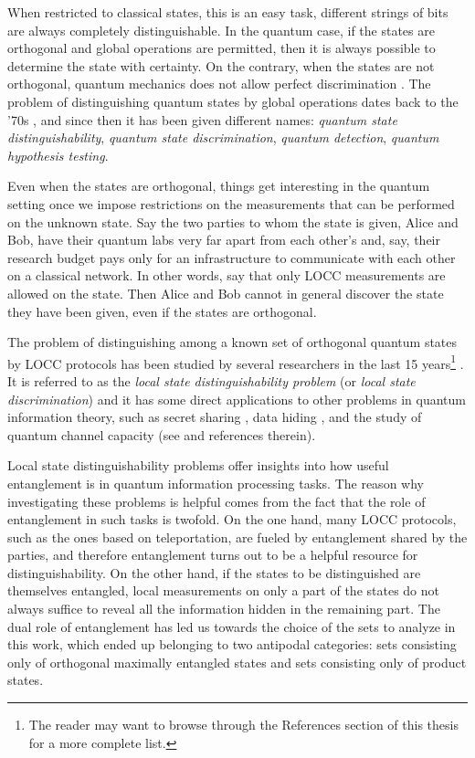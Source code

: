 When restricted to classical states, this is an easy task, 
different strings of bits are always completely distinguishable. 
In the quantum case, if the states are orthogonal and global operations 
are permitted, then it is always possible to determine the state
with certainty.
On the contrary, when the states are not orthogonal, quantum mechanics does not allow 
perfect discrimination \cite{Nielsen11}.
The problem of distinguishing quantum states by global operations 
dates back to the '70s \cite{Helstrom1969},
and since then it has been given different names: \emph{quantum state distinguishability}, 
\emph{quantum state discrimination}, \emph{quantum detection}, 
\emph{quantum hypothesis testing}.


Even when the states are orthogonal, things get interesting in the quantum setting 
once we impose 
restrictions on the measurements that can be performed on the unknown state.
Say the two parties to whom the state is given, Alice and Bob,
have their quantum labs very far apart from each other's and, say, their research budget 
pays only for an infrastructure to communicate with each other on a classical network.
In other words, say that only LOCC measurements are allowed on the state. 
Then Alice and Bob cannot in general discover the state they have been given, 
even if the states are orthogonal.

The problem of distinguishing among a known set 
of orthogonal quantum states by LOCC protocols has been studied by several researchers in the last 15 years\footnote{The reader may want to browse through the References section of this thesis for a more complete list.}
\cite{Bennett99,Walgate00,Ghosh01,Horodecki03,Fan04,Ghosh04,Nathanson05,Watrous05,Yu11,Yu12}.
It is referred to as the \emph{local state distinguishability problem} (or 
\emph{local state discrimination}) and it has some direct applications 
to other problems in quantum information theory, 
such as secret sharing \cite{Cleve99,Gottesman00}, 
data hiding \cite{Terhal01a,DiVincenzo2002}, and the study of quantum channel 
capacity (see \cite{Watrous05,Yu11} and references therein).

Local state distinguishability problems offer insights into how useful entanglement 
is in quantum information processing tasks.
The reason why investigating these problems is helpful comes from the fact that the role of entanglement 
in such tasks is twofold. On the one hand, many LOCC protocols, such as the ones based on teleportation, 
are fueled by entanglement shared by the parties, and therefore entanglement turns 
out to be a helpful resource for distinguishability. 
On the other hand, if the states to be distinguished are themselves entangled,
local measurements on only a part of the states do not always suffice to reveal 
all the information hidden in the remaining part.
The dual role of entanglement has led us towards the choice of the sets to analyze 
in this work, which ended up belonging to two antipodal categories: sets consisting only of orthogonal maximally entangled states
and sets consisting only of product states.

